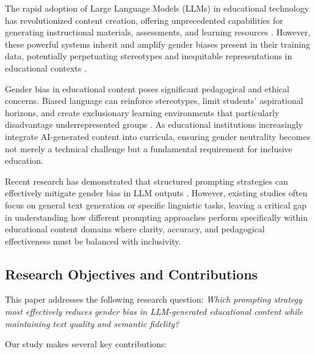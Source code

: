 The rapid adoption of Large Language Models (LLMs) in educational technology has revolutionized content creation, offering unprecedented capabilities for generating instructional materials, assessments, and learning resources \cite{openai2023gpt4}. However, these powerful systems inherit and amplify gender biases present in their training data, potentially perpetuating stereotypes and inequitable representations in educational contexts \cite{urchs2024chatgptbias, zhao2024multilangbias}.

Gender bias in educational content poses significant pedagogical and ethical concerns. Biased language can reinforce stereotypes, limit students' aspirational horizons, and create exclusionary learning environments that particularly disadvantage underrepresented groups \cite{you2024beyondbinary}. As educational institutions increasingly integrate AI-generated content into curricula, ensuring gender neutrality becomes not merely a technical challenge but a fundamental requirement for inclusive education.

Recent research has demonstrated that structured prompting strategies can effectively mitigate gender bias in LLM outputs \cite{zeng2024debiasprompting, savoldi2024neutraltranslation}. However, existing studies often focus on general text generation or specific linguistic tasks, leaving a critical gap in understanding how different prompting approaches perform specifically within educational content domains where clarity, accuracy, and pedagogical effectiveness must be balanced with inclusivity.

\subsection{Research Objectives and Contributions}

This paper addresses the following research question: \textit{Which prompting strategy most effectively reduces gender bias in LLM-generated educational content while maintaining text quality and semantic fidelity?}

Our study makes several key contributions:

